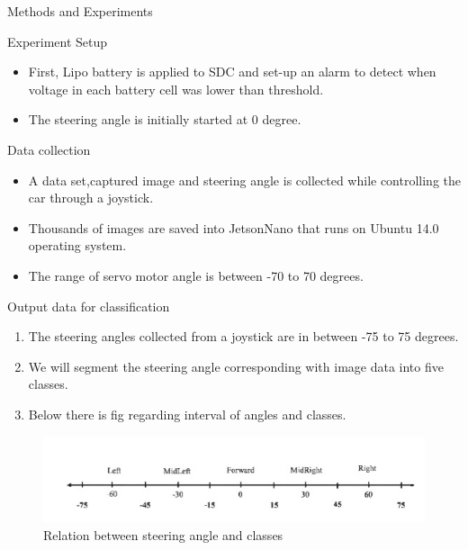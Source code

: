 \documentclass{beamer}
\begin{document}
\begin{frame}{Methods and Experiments}
\begin{block}{Experiment Setup}
\begin{itemize}
    \item First, Lipo battery is applied to SDC and set-up an alarm to detect when voltage in each battery cell was lower than threshold.
    \item The steering angle is initially started at 0 degree.
    \end{itemize}
\end{block}


\begin{block}{Data collection}
\begin{itemize}
  \item A data set,captured image and steering angle is collected while controlling the car through a joystick.
  \item Thousands of images are saved into JetsonNano that runs on Ubuntu 14.0 operating system. 
  \item The range of servo motor angle is between -70 to 70 degrees.
\end{itemize}
\end{block}    
\end{frame}

\begin{frame}
\begin{block}{Output data for classification}
\begin{enumerate}
    \item The steering angles collected from a joystick are in between -75 to 75 degrees.
    \item We will segment the steering angle corresponding with image data into five classes.
    \item Below there is fig regarding interval of angles and classes.
    \end{enumerate}
\end{block}
    
\begin{figure}[ht]
    \centering
    \includegraphics[width=1\textwidth]{SA intervals.jpg}
    \caption{Relation between steering angle and classes} 
    
\end{figure}
    
\end{frame}
\end{document}
